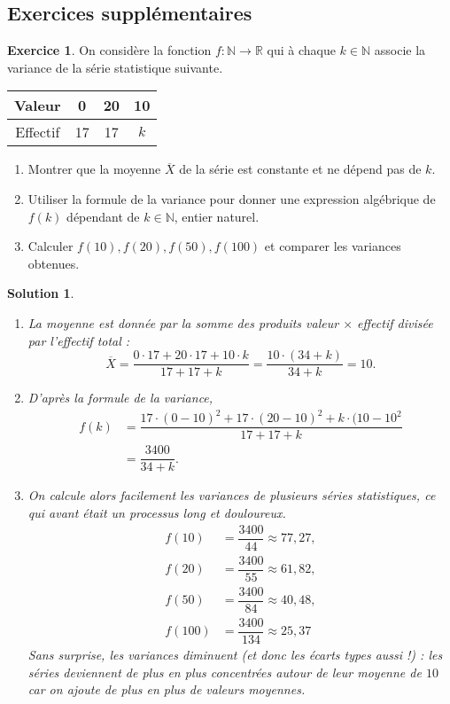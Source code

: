 \documentclass[a4paper, 14pt]{extarticle}
\theoremstyle{plain}
\newtheorem*{sol}{Solution}
\theoremstyle{definition}
\newtheorem{ex}{Exercice}
\newcommand{\R}{\mathbb{R}}
\newcommand{\N}{\mathbb{N}}
\newcommand{\exe}[2]{
		\begin{ex} #1  \end{ex}
		\begin{sol} #2 \end{sol}
	}
\newcommand{\exe}[2]{
		\begin{ex} #1  \end{ex}
	}
\begin{document}
\subsection*{Exercices supplémentaires}

	
	\exe{
		On considère la fonction $f:\N\rightarrow\R$ qui à chaque $k\in\N$ associe la variance de la série statistique suivante.
		
		
		\begin{center}
		\begin{tabular}{|c|c|c|c|}\hline
		Valeur   & 0 & 20 & 10 \\ \hline
		Effectif & 17 & 17 & $k$ \\ \hline
		\end{tabular}
		\end{center}
		
		\begin{enumerate}
			\item
			Montrer que la moyenne $\overline{X}$ de la série est constante et ne dépend pas de $k$.
			\item
			Utiliser la formule de la variance pour donner une expression algébrique de $f(k)$ dépendant de $k\in\N$, entier naturel.
			\item
			Calculer $f(10), f(20), f(50), f(100)$ et comparer les variances obtenues.
		\end{enumerate}
	}{
		\begin{enumerate}
			\item
			La moyenne est donnée par la somme des produits valeur $\times$ effectif divisée par l'effectif total :
				\[ \overline{X} = \dfrac{0\cdot17 + 20\cdot17 + 10\cdot k}{17+17+k} =\dfrac{10\cdot(34+k)}{34+k} = 10.
				\]
			\item
			D'après la formule de la variance,
				\begin{align*}
					f(k) &= \dfrac{17 \cdot (0-10)^2 + 17 \cdot (20-10)^2 + k \cdot(10-10^2}{17+17+k} \\
						&= \dfrac{3400}{34+k}.
				\end{align*}
			\item
			On calcule alors facilement les variances de plusieurs séries statistiques, ce qui avant était un processus long et douloureux.
				\begin{align*}
					f(10) &= \dfrac{3400}{44} \approx 77,27, \\
					f(20) &= \dfrac{3400}{55} \approx 61,82, \\
					f(50) &= \dfrac{3400}{84} \approx 40,48, \\
					f(100) &= \dfrac{3400}{134}\approx 25,37
				\end{align*}
			Sans surprise, les variances diminuent (et donc les écarts types aussi !) : les séries deviennent de plus en plus concentrées autour de leur moyenne de $10$ car on ajoute de plus en plus de valeurs moyennes.
		\end{enumerate}
	
	
	}
\end{document}
